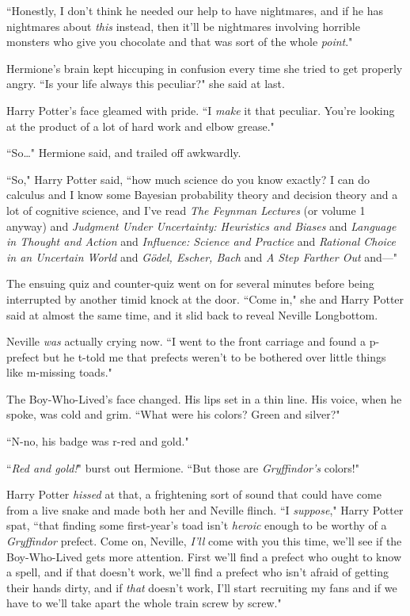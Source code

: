 ``Honestly, I don't think he needed our help to have nightmares, and if he has nightmares about \emph{this} instead, then it'll be nightmares involving horrible monsters who give you chocolate and that was sort of the whole \emph{point}."

Hermione's brain kept hiccuping in confusion every time she tried to get properly angry. ``Is your life always this peculiar?" she said at last.

Harry Potter's face gleamed with pride. ``I \emph{make} it that peculiar. You're looking at the product of a lot of hard work and elbow grease."

``So{\ldots}" Hermione said, and trailed off awkwardly.

``So," Harry Potter said, ``how much science do you know exactly? I can do calculus and I know some Bayesian probability theory and decision theory and a lot of cognitive science, and I've read \emph{The Feynman Lectures} (or volume 1 anyway) and \emph{Judgment Under Uncertainty: Heuristics and Biases} and \emph{Language in Thought and Action} and \emph{Influence: Science and Practice} and \emph{Rational Choice in an Uncertain World} and \emph{Gödel, Escher, Bach} and \emph{A Step Farther Out} and---"

The ensuing quiz and counter-quiz went on for several minutes before being interrupted by another timid knock at the door. ``Come in," she and Harry Potter said at almost the same time, and it slid back to reveal Neville Longbottom.

Neville \emph{was} actually crying now. ``I went to the front carriage and found a p-prefect but he t-told me that prefects weren't to be bothered over little things like m-missing toads."

The Boy-Who-Lived's face changed. His lips set in a thin line. His voice, when he spoke, was cold and grim. ``What were his colors? Green and silver?"

``N-no, his badge was r-red and gold."

``\emph{Red and gold!}" burst out Hermione. ``But those are \emph{Gryffindor's} colors!"

Harry Potter \emph{hissed} at that, a frightening sort of sound that could have come from a live snake and made both her and Neville flinch. ``I \emph{suppose}," Harry Potter spat, ``that finding some first-year's toad isn't \emph{heroic} enough to be worthy of a \emph{Gryffindor} prefect. Come on, Neville, \emph{I'll} come with you this time, we'll see if the Boy-Who-Lived gets more attention. First we'll find a prefect who ought to know a spell, and if that doesn't work, we'll find a prefect who isn't afraid of getting their hands dirty, and if \emph{that} doesn't work, I'll start recruiting my fans and if we have to we'll take apart the whole train screw by screw."

